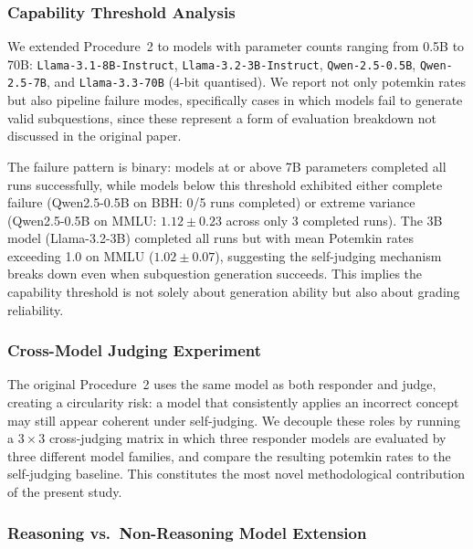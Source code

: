 \documentclass[sigconf,authordraft]{acmart}
\begin{document}
\subsubsection{Capability Threshold Analysis}

We extended Procedure~2 to models with parameter counts ranging from 0.5B to 70B: \texttt{Llama-3.1-8B-Instruct}, \texttt{Llama-3.2-3B-Instruct}, \texttt{Qwen-2.5-0.5B}, \texttt{Qwen-2.5-7B}, and \texttt{Llama-3.3-70B} (4-bit quantised). We report not only potemkin rates but also pipeline failure modes, specifically cases in which models fail to generate valid subquestions, since these represent a form of evaluation breakdown not discussed in the original paper.

The failure pattern is binary: models at or above 7B parameters completed all runs successfully, while models below this threshold exhibited either complete failure (Qwen2.5-0.5B on BBH: 0/5 runs completed) or extreme variance (Qwen2.5-0.5B on MMLU: $1.12 \pm 0.23$ across only 3 completed runs). The 3B model (Llama-3.2-3B) completed all runs but with mean Potemkin rates exceeding 1.0 on MMLU ($1.02 \pm 0.07$), suggesting the self-judging mechanism breaks down even when subquestion generation succeeds. This implies the capability threshold is not solely about generation ability but also about grading reliability.

\subsubsection{Cross-Model Judging Experiment}

The original Procedure~2 uses the same model as both responder and judge, creating a circularity risk: a model that consistently applies an incorrect concept may still appear coherent under self-judging. We decouple these roles by running a $3 \times 3$ cross-judging matrix in which three responder models are evaluated by three different model families, and compare the resulting potemkin rates to the self-judging baseline. This constitutes the most novel methodological contribution of the present study.


\subsubsection{Reasoning vs.\ Non-Reasoning Model Extension}
\end{document}
